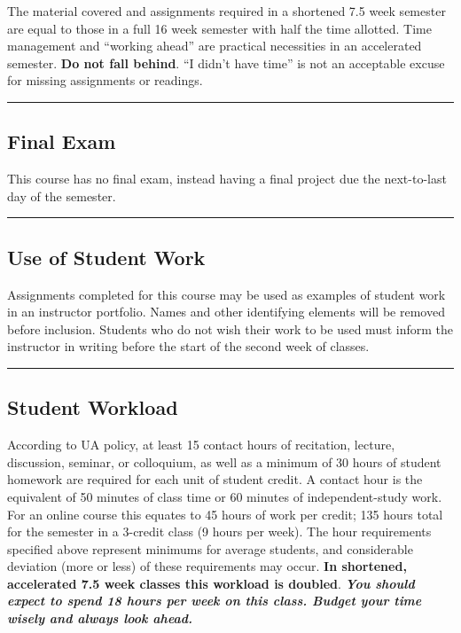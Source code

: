 \documentclass[]{article}
\begin{document}
The material covered and assignments required in a shortened 7.5 week
semester are equal to those in a full 16 week semester with half the
time allotted. Time management and ``working ahead'' are practical
necessities in an accelerated semester. \textbf{Do not fall behind}. ``I
didn't have time'' is not an acceptable excuse for missing assignments
or readings.

\begin{center}\rule{0.5\linewidth}{\linethickness}\end{center}

\hypertarget{final-exam}{%
\subsection{Final Exam}\label{final-exam}}

This course has no final exam, instead having a final project due the
next-to-last day of the semester.

\begin{center}\rule{0.5\linewidth}{\linethickness}\end{center}

\hypertarget{use-of-student-work}{%
\subsection{Use of Student Work}\label{use-of-student-work}}

Assignments completed for this course may be used as examples of student
work in an instructor portfolio. Names and other identifying elements
will be removed before inclusion. Students who do not wish their work to
be used must inform the instructor in writing before the start of the
second week of classes.

\begin{center}\rule{0.5\linewidth}{\linethickness}\end{center}

\hypertarget{student-workload}{%
\subsection{Student Workload}\label{student-workload}}

According to UA policy, at least 15 contact hours of recitation,
lecture, discussion, seminar, or colloquium, as well as a minimum of 30
hours of student homework are required for each unit of student credit.
A contact hour is the equivalent of 50 minutes of class time or 60
minutes of independent-study work. For an online course this equates to
45 hours of work per credit; 135 hours total for the semester in a
3-credit class (9 hours per week). The hour requirements specified above
represent minimums for average students, and considerable deviation
(more or less) of these requirements may occur. \textbf{In shortened,
accelerated 7.5 week classes this workload is doubled}.
\textbf{\emph{You should expect to spend 18 hours per week on this
class. Budget your time wisely and always look ahead.}}
\end{document}
